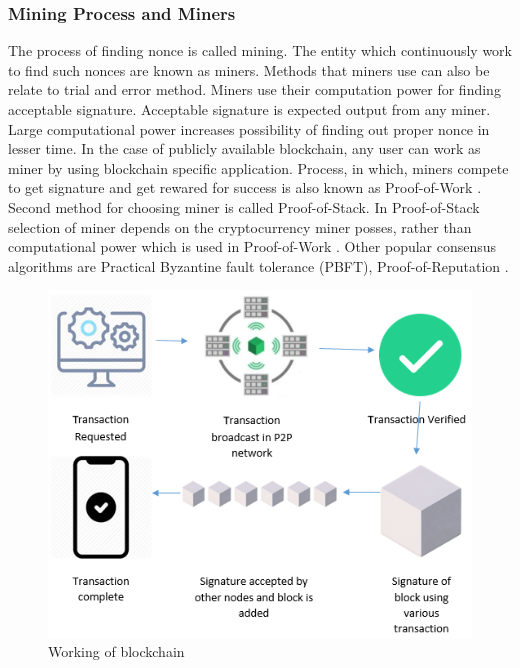 \documentclass[a4paper,twoside,12pt]{report}
\begin{document}
\begin{spacing}{1.5}
\subsubsection{Mining Process and Miners}
\label{miningprocess}
The process of finding nonce is called mining. The entity which continuously work to find such nonces are known as miners. Methods that miners use can also be relate to trial and error method. Miners use their computation power for finding acceptable signature. Acceptable signature is expected output from any miner. Large computational power increases possibility of finding out proper nonce in lesser time. In the case of publicly available blockchain, any user can work as miner by using blockchain specific application. Process, in which, miners compete to get signature and get rewared for success is also known as Proof-of-Work \cite{satoshinakamoto}. Second method for choosing miner is called Proof-of-Stack. In Proof-of-Stack selection of miner depends on the cryptocurrency miner posses, rather than computational power which is used in Proof-of-Work \cite{saad_exploring_2019}. Other popular consensus algorithms are Practical Byzantine fault tolerance (PBFT), Proof-of-Reputation \cite{saad_exploring_2019}.
\begin{figure}[h!]
\begin{center}
  \includegraphics[width=0.8\linewidth]{images/workingofblockchain.png}
  \caption{Working of blockchain}
  \label{img: workingofblockchain}
\end{center}
\end{figure}  

\end{spacing}
\end{document}
